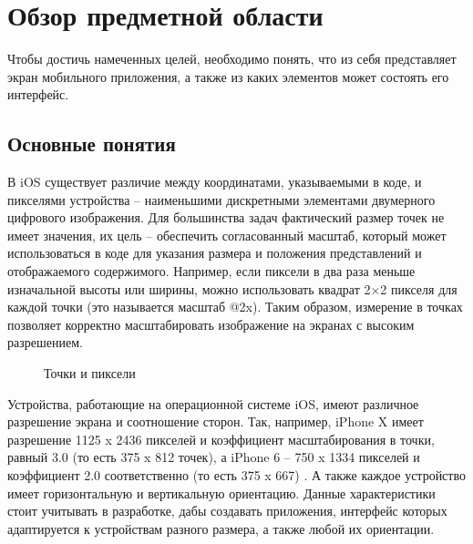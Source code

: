 \chapter{Обзор предметной области}

Чтобы достичь намеченных целей, необходимо понять, что из себя представляет экран мобильного приложения, а также из каких элементов может состоять его интерфейс.

\section{Основные понятия}
В iOS существует различие между координатами, указываемыми в коде, и пикселями устройства \cite{pixel} -- наименьшими дискретными элементами двумерного цифрового изображения. Для большинства задач фактический размер точек \cite{point} не имеет значения, их цель -- обеспечить согласованный масштаб, который может использоваться в коде для указания размера и положения представлений и отображаемого содержимого. Например, если пиксели в два раза меньше изначальной высоты или ширины, можно использовать квадрат 2×2 пикселя для каждой точки (это называется масштаб @2x). Таким образом, измерение в точках позволяет корректно масштабировать изображение на экранах с высоким разрешением. \cite{hig}

\begin{figure}[h!]
	\caption{Точки и пиксели}
	\label{fig:points}
\end{figure}

Устройства, работающие на операционной системе iOS, имеют различное разрешение экрана и соотношение сторон. Так, например, iPhone X имеет разрешение 1125 x 2436 пикселей и коэффициент масштабирования в точки, равный 3.0 (то есть 375 x 812 точек), а iPhone 6  -- 750 x 1334 пикселей и коэффициент 2.0 соответственно (то есть 375 x 667) \cite{displays}. А также каждое устройство имеет горизонтальную и вертикальную ориентацию. Данные характеристики стоит учитывать в разработке, дабы создавать приложения, интерфейс которых адаптируется к устройствам разного размера, а также любой их ориентации. 

